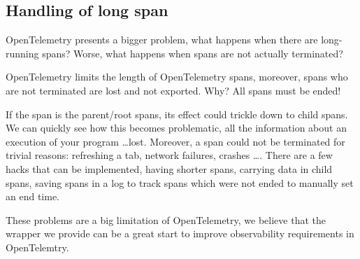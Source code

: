     \subsection{Handling of long span}
        OpenTelemetry presents a bigger problem, what happens when there are long-running spans? Worse, what happens when spans are not actually terminated?

        OpenTelemetry limits the length of OpenTelemetry spans, moreover, spans who are not terminated are lost and not exported. Why? All spans must be ended!

        If the span is the parent/root spans, its effect could trickle down to child spans. We can quickly see how this becomes problematic, all the information about an execution of your program \dots lost. Moreover, a span could not be terminated for trivial reasons: refreshing a tab, network failures, crashes \dots \cite{otel-l}. There are a few hacks that can be implemented, having shorter spans, carrying data in child spans, saving spans in a log to track spans which were not ended to manually set an end time.

        These problems are a big limitation of OpenTelemetry, we believe that the wrapper we provide can be a great start to improve observability requirements in OpenTelemtry.
